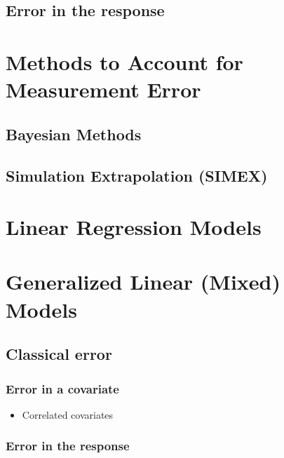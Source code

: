 \documentclass[]{book}
\providecommand{\tightlist}{%
  \setlength{\itemsep}{0pt}\setlength{\parskip}{0pt}}
\theoremstyle{definition}
\theoremstyle{definition}
\theoremstyle{definition}
\theoremstyle{remark}
\begin{document}
\section{Error in the response}\label{error-in-the-response}

\hypertarget{accounting}{\chapter{Methods to Account for Measurement
Error}\label{accounting}}

\section{Bayesian Methods}\label{bayesian-methods}

\section{Simulation Extrapolation
(SIMEX)}\label{simulation-extrapolation-simex}

\chapter{Linear Regression Models}\label{LinReg}

\chapter{Generalized Linear (Mixed) Models}\label{GLMMs}

\section{Classical error}\label{classical-error}

\subsection{Error in a covariate}\label{error-in-a-covariate}

\begin{itemize}
\tightlist
\item
  Correlated covariates
\end{itemize}

\subsection{Error in the response}\label{error-in-the-response-1}
\end{document}
